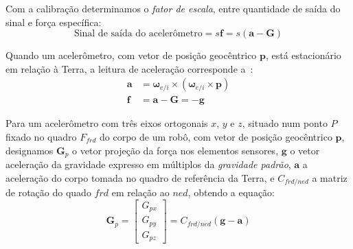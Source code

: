 Com a calibração determinamos o \textit{fator de escala}, entre quantidade de saída do sinal e força específica\cite{Stevens2016}:
\begin{equation} \label{eq:1.6-28}
    \text{Sinal de saída do acelerômetro} = s \mathbf{f} = s \left(\mathbf{a} - \mathbf{G} \right)
\end{equation}

Quando um acelerômetro, com vetor de posição geocêntrico\footnotemark{} \(\mathbf{p}\), está estacionário em relação à Terra, a leitura de aceleração corresponde a~\cite{Stevens2016}:
\begin{align}
    \mathbf{a} &= {\mathbf{\omega}_{e/i}}\!\times\!\left({\mathbf{\omega}_{e/i}}\!\times\!{\mathbf{p}}\right) \\
    \mathbf{f} &= \mathbf{a} - \mathbf{G} = -\!{\mathbf{g}} \label{eq:1.6-29}
\end{align}

Para um acelerômetro com três eixos ortogonais \(x\), \(y\) e \(z\), situado num ponto \({P}\) fixado no quadro \({F}_{frd}\) do corpo de um robô, com vetor de posição geocêntrico \(\mathbf{p}\), designamos \(\mathbf{G}_{p}\) o vetor projeção da força nos elementos sensores, \(\mathbf{g}\) o vetor aceleração da gravidade expresso em múltiplos da \emph{gravidade padrão}, \(\mathbf{a}\) a aceleração do corpo tomada no quadro de referência da Terra, e \({C}_{frd/ned}\) a matriz de rotação do quado \(frd\) em relação ao \(ned\), obtendo a equação:
\begin{equation*}
    {\mathbf{G}}_p = \begin{bmatrix} {G}_{px} \\ {G}_{py} \\ {G}_{pz} \end{bmatrix} = {C}_{frd/ned}\left(\mathbf{g} - {\mathbf{a}}\right)
\end{equation*}

